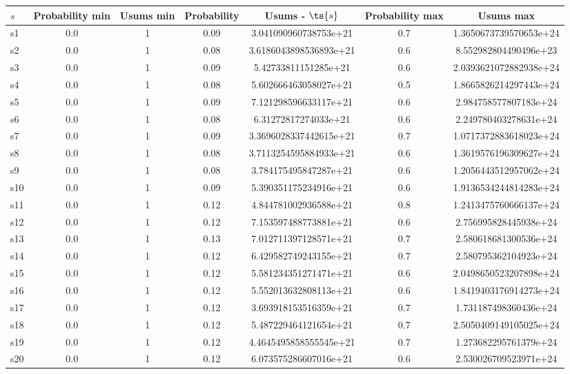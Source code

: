 \documentclass{article}
\begin{document}
\noindent\begin{tabular}{|l|c|c|c|c|c|c|}
\hline
$s$& Probability min & Usums min & Probability & Usums - $\ts{s}$ & Probability max & Usums max\\
\hline
s1 &0.0 & 1 & 0.09 & 3.041090960738753e+21 & 0.7 & 1.3650673739570653e+24\\
\hline
s2 &0.0 & 1 & 0.08 & 3.6186043898536893e+21 & 0.6 & 8.552982804490496e+23\\
\hline
s3 &0.0 & 1 & 0.09 & 5.42733811151285e+21 & 0.6 & 2.0393621072882938e+24\\
\hline
s4 &0.0 & 1 & 0.08 & 5.602666463058027e+21 & 0.5 & 1.8665826214297443e+24\\
\hline
s5 &0.0 & 1 & 0.09 & 7.121298596633117e+21 & 0.6 & 2.984758577807183e+24\\
\hline
s6 &0.0 & 1 & 0.08 & 6.31272817274033e+21 & 0.6 & 2.249780403278631e+24\\
\hline
s7 &0.0 & 1 & 0.09 & 3.3696028337442615e+21 & 0.7 & 1.0717372883618023e+24\\
\hline
s8 &0.0 & 1 & 0.08 & 3.7113254595884933e+21 & 0.6 & 1.3619576196309627e+24\\
\hline
s9 &0.0 & 1 & 0.08 & 3.784175495847287e+21 & 0.6 & 1.2056443512957062e+24\\
\hline
s10 &0.0 & 1 & 0.09 & 5.390351175234916e+21 & 0.6 & 1.9136534244814283e+24\\
\hline
s11 &0.0 & 1 & 0.12 & 4.844781002936588e+21 & 0.8 & 1.2413475760666137e+24\\
\hline
s12 &0.0 & 1 & 0.12 & 7.153597488773881e+21 & 0.6 & 2.756995828445938e+24\\
\hline
s13 &0.0 & 1 & 0.13 & 7.012711397128571e+21 & 0.7 & 2.580618681300536e+24\\
\hline
s14 &0.0 & 1 & 0.12 & 6.429582749243155e+21 & 0.7 & 2.580795362104923e+24\\
\hline
s15 &0.0 & 1 & 0.12 & 5.581234351271471e+21 & 0.6 & 2.0498650523207898e+24\\
\hline
s16 &0.0 & 1 & 0.12 & 5.552013632808113e+21 & 0.6 & 1.8419403176914273e+24\\
\hline
s17 &0.0 & 1 & 0.12 & 3.693918153516359e+21 & 0.7 & 1.731187498360436e+24\\
\hline
s18 &0.0 & 1 & 0.12 & 5.487229464121654e+21 & 0.7 & 2.5050409149105025e+24\\
\hline
s19 &0.0 & 1 & 0.12 & 4.4645495858555545e+21 & 0.7 & 1.273682295761379e+24\\
\hline
s20 &0.0 & 1 & 0.12 & 6.073575286607016e+21 & 0.6 & 2.530026709523971e+24\\

\end{tabular}
\end{document}
